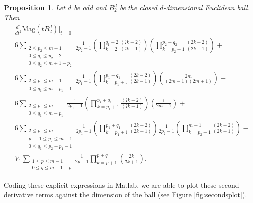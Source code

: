\documentclass[11pt]{article}
\theoremstyle{mythm}
\newtheorem{prop}[defn]{Proposition}
\begin{document}
\begin{prop}\label{prop:partialres}
Let $d$ be odd and $B_2^d$ be the closed $d$-dimensional Euclidean ball. Then
\begin{equation}\label{eqn:partialres}
\begin{aligned}
&\frac{d^2}{dt^2}\text{Mag}(tB_2^d)\big\vert_{t=0} = \\
&6\sum\limits_{\substack{2\leq p_2\leq m+1 \\ 0\leq q_1 \leq p_2-2 \\ 0\leq q_2 \leq m+1-p_2}}\frac{1}{2p_2-1}\left(\prod\limits_{k=2}^{q_1+2}\frac{(2k-2)}{(2k-1)}\right)\left(\prod\limits_{k=p_2+1}^{p_2+q_2}\frac{(2k-2)}{(2k-1)}\right) + \\
&6\sum\limits_{\substack{2\leq p_1\leq m-1 \\ 0\leq q_1\leq m-p_1-1}}\frac{1}{2p_1-1}\left(\prod\limits_{k=p_1+1}^{p_1+q_1}\frac{(2k-2)}{(2k-1)}\right)\left(\frac{2m}{(2m-1)(2m+1)}\right) + \\
&6\sum\limits_{\substack{2\leq p_1\leq m \\ 0\leq q_1\leq m-p_1}}\frac{1}{2p_1-1}\left(\prod\limits_{k=p_1+1}^{p_1+q_1}\frac{(2k-2)}{(2k-1)}\right)\left(\frac{1}{2m+1}\right) + \\
&6\sum\limits_{\substack{2\leq p_1\leq m \\ p_1+1\leq p_2 \leq m-1 \\ 0\leq q_1\leq p_2-p_1-1 }}\frac{1}{2p_1-1}\left(\prod\limits_{k=p_1+1}^{p_1+q_1}\frac{(2k-2)}{(2k-1)}\right)\frac{1}{2p_2-1}\left(\prod\limits_{k=p_2+1}^{m+1}\frac{(2k-2)}{(2k-1)}\right) - \\
&V_{1}\sum\limits_{\substack{1\leq p \leq m-1 \\ 0 \leq q \leq m - 1 - p}}\frac{1}{2p+1}\prod\limits_{k=p+1}^{p+q}\left(\frac{2k}{2k+1}\right).
\end{aligned}
\end{equation}
\end{prop}

Coding these explicit expressions in Matlab, we are able to plot these second derivative terms against the dimension of the ball (see Figure \ref{fig:secondsplot}).
\end{document}
